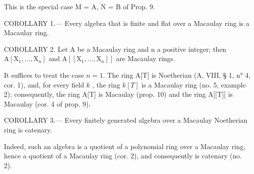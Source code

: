 This is the special case M = A, N = B of Prop. 9.

COROLLARY 1.--- Every algebra that is finite and flat over a Macaulay ring is a Macaulay ring.

COROLLARY 2. Let A be a Macaulay ring and n a positive integer; then \(\mathrm{A}[\mathrm{X}_1,\dots ,\mathrm{X}_n]\) and \(\mathrm{A}[[\mathrm{X}_1,\dots ,\mathrm{X}_n]]\) are Macaulay rings.

It suffices to treat the case \(n = 1\). The ring A{[}T{]} is Noetherian (A, VIII, § 1, n° 4, cor. 1), and, for every field \(k\) , the ring \(k[T]\) is a Macaulay ring (no. 5, example 2); consequently, the ring A{[}T{]} is Macaulay (prop. 10) and the ring A{[}{[}T{]}{]} is Macaulay (cor. 4 of prop. 9).

COROLLARY 3.--- Every finitely generated algebra over a Macaulay Noetherian ring is catenary.

Indeed, such an algebra is a quotient of a polynomial ring over a Macaulay ring, hence a quotient of a Macaulay ring (cor. 2), and consequently is catenary (no. 2).

